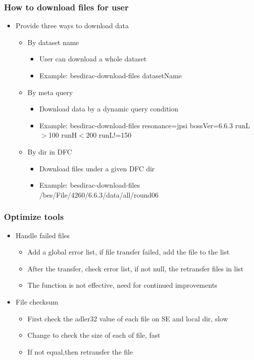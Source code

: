 \documentclass{beamer}
\begin{document}
\begin{frame}
  \frametitle{How to download files for user}
  \begin{itemize}
    \item Provide three ways to download data 
      \begin{itemize}
          \item By dataset name
            \begin{itemize}
                \item User can download a whole dataset
                \item Example: besdirac-download-files datasetName
            \end{itemize}
          \item By meta query 
            \begin{itemize}
                \item Download data by a dynamic query condition
                \item Example: besdirac-download-files resonance=jpsi bossVer=6.6.3 runL$>$100 runH$<$200 runL!=150
            \end{itemize}
          \item By dir in DFC
            \begin{itemize}
                \item Download files under a given DFC dir
                \item Example: besdirac-download-files /bes/File/4260/6.6.3/data/all/round06 
            \end{itemize}
      \end{itemize}
  \end{itemize}
\end{frame}

\begin{frame}
  \frametitle{Optimize tools}
  \begin{itemize}
    \item Handle failed files 
      \begin{itemize}
          \item Add a global error list, if file transfer failed, add the file to the list
          \item After the transfer, check error list, if not null, the retransfer files in list 
          \item The function is not effective, need for continued improvements 
      \end{itemize}
    \item File checksum 
      \begin{itemize}
          \item First check the adler32 value of each file on SE and local dir, slow
          \item Change to check the size of each of file, fast
          \item If not equal,then retransfer the file
      \end{itemize}
  \end{itemize}
\end{frame}
\end{document}
